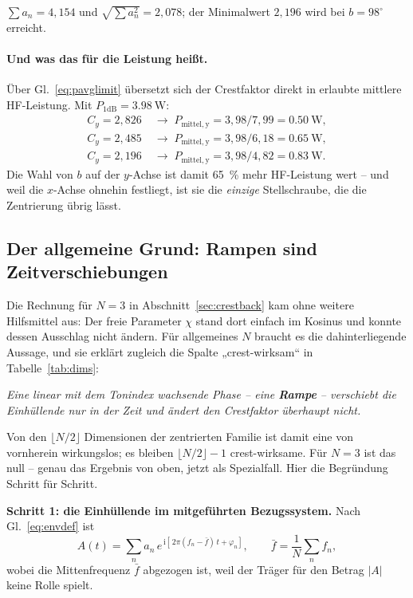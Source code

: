 \documentclass[11pt,a4paper]{article}
\newcommand{\crest}{\ensuremath{C}}
\begin{document}
\noindent$\sum a_n = 4{,}154$ und $\sqrt{\sum a_n^2}=2{,}078$; der
Minimalwert $2{,}196$ wird bei $b=98^\circ$ erreicht.

\paragraph{Und was das für die Leistung heißt.}
Über Gl.~\eqref{eq:pavglimit} übersetzt sich der Crestfaktor direkt in
erlaubte mittlere HF-Leistung. Mit $P_{1\mathrm{dB}}=\SI{3.98}{\watt}$:
\begin{align}
  \crest_y = 2{,}826 \;&\rightarrow\; P_\mathrm{mittel,y} = 3{,}98/7{,}99 = \SI{0.50}{\watt},\\
  \crest_y = 2{,}485 \;&\rightarrow\; P_\mathrm{mittel,y} = 3{,}98/6{,}18 = \SI{0.65}{\watt},\\
  \crest_y = 2{,}196 \;&\rightarrow\; P_\mathrm{mittel,y} = 3{,}98/4{,}82 = \SI{0.83}{\watt}.
\end{align}
Die Wahl von $b$ auf der $y$-Achse ist damit \SI{65}{\percent} mehr
HF-Leistung wert -- und weil die $x$-Achse ohnehin festliegt, ist sie die
\emph{einzige} Stellschraube, die die Zentrierung übrig lässt.

\subsection{Der allgemeine Grund: Rampen sind Zeitverschiebungen}
\label{sec:rampen}

Die Rechnung für $N=3$ in Abschnitt~\ref{sec:crestback} kam ohne weitere
Hilfsmittel aus: Der freie Parameter $\chi$ stand dort einfach im Kosinus und
konnte dessen Ausschlag nicht ändern. Für allgemeines $N$ braucht es die
dahinterliegende Aussage, und sie erklärt zugleich die Spalte
„crest-wirksam`` in Tabelle~\ref{tab:dims}:

\begin{center}
\emph{Eine linear mit dem Tonindex wachsende Phase -- eine \textbf{Rampe} --
verschiebt die Einhüllende nur in der Zeit und ändert den Crestfaktor
überhaupt nicht.}
\end{center}

\noindent Von den $\lfloor N/2\rfloor$ Dimensionen der zentrierten Familie
ist damit eine von vornherein wirkungslos; es bleiben
$\lfloor N/2\rfloor - 1$ crest-wirksame. Für $N=3$ ist das null -- genau das
Ergebnis von oben, jetzt als Spezialfall. Hier die Begründung Schritt für
Schritt.

\medskip
\noindent\textbf{Schritt 1: die Einhüllende im mitgeführten Bezugssystem.}
Nach Gl.~\eqref{eq:envdef} ist
\begin{equation}
  A(t) = \sum_n a_n\,e^{\,\mathrm{i}[\,2\pi (f_n-\bar f)\,t + \varphi_n]} ,
  \qquad \bar f = \frac{1}{N}\sum_n f_n ,
\end{equation}
wobei die Mittenfrequenz $\bar f$ abgezogen ist, weil der Träger für den
Betrag $|A|$ keine Rolle spielt.
\end{document}
